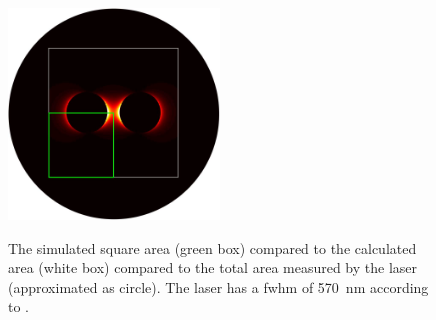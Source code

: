 \begin{figure}[!h]
  \centering
  \includegraphics[width=0.5\textwidth]{./images/fwhm-chart.jpg}
  \label{symmetry}
  \caption{The simulated square area (green box) compared to the calculated area (white box) compared to the total area measured by the laser (approximated as circle). The laser has a fwhm of \SI{570}{nm} according to \cite{heeg}.}
\end{figure}


\newpage
\null
\newpage
